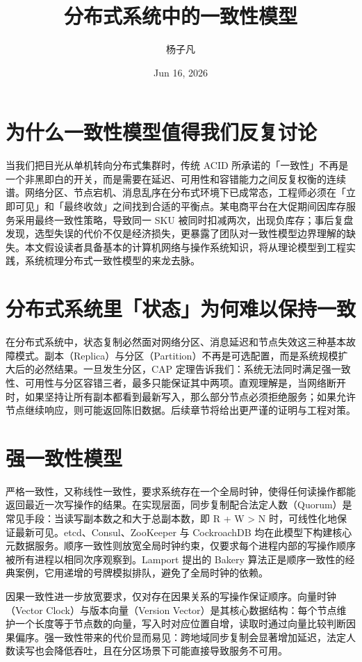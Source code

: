 \title{分布式系统中的一致性模型}
\author{杨子凡}
\date{Jun 16, 2026}
\maketitle
\chapter{为什么一致性模型值得我们反复讨论}
当我们把目光从单机转向分布式集群时，传统 ACID 所承诺的「一致性」不再是一个非黑即白的开关，而是需要在延迟、可用性和容错能力之间反复权衡的连续谱。网络分区、节点宕机、消息乱序在分布式环境下已成常态，工程师必须在「立即可见」和「最终收敛」之间找到合适的平衡点。某电商平台在大促期间因库存服务采用最终一致性策略，导致同一 SKU 被同时扣减两次，出现负库存；事后复盘发现，选型失误的代价不仅是经济损失，更暴露了团队对一致性模型边界理解的缺失。本文假设读者具备基本的计算机网络与操作系统知识，将从理论模型到工程实践，系统梳理分布式一致性模型的来龙去脉。\par
\chapter{分布式系统里「状态」为何难以保持一致}
在分布式系统中，状态复制必然面对网络分区、消息延迟和节点失效这三种基本故障模式。副本（Replica）与分区（Partition）不再是可选配置，而是系统规模扩大后的必然结果。一旦发生分区，CAP 定理告诉我们：系统无法同时满足强一致性、可用性与分区容错三者，最多只能保证其中两项。直观理解是，当网络断开时，如果坚持让所有副本都看到最新写入，那么部分节点必须拒绝服务；如果允许节点继续响应，则可能返回陈旧数据。后续章节将给出更严谨的证明与工程对策。\par
\chapter{强一致性模型}
严格一致性，又称线性一致性，要求系统存在一个全局时钟，使得任何读操作都能返回最近一次写操作的结果。在实现层面，同步复制配合法定人数（Quorum）是常见手段：当读写副本数之和大于总副本数，即 R + W > N 时，可线性化地保证最新可见。etcd、Consul、ZooKeeper 与 CockroachDB 均在此模型下构建核心元数据服务。顺序一致性则放宽全局时钟约束，仅要求每个进程内部的写操作顺序被所有进程以相同次序观察到。Lamport 提出的 Bakery 算法正是顺序一致性的经典案例，它用递增的号牌模拟排队，避免了全局时钟的依赖。\par
因果一致性进一步放宽要求，仅对存在因果关系的写操作保证顺序。向量时钟（Vector Clock）与版本向量（Version Vector）是其核心数据结构：每个节点维护一个长度等于节点数的向量，写入时对应位置自增，读取时通过向量比较判断因果偏序。强一致性带来的代价显而易见：跨地域同步复制会显著增加延迟，法定人数读写也会降低吞吐，且在分区场景下可能直接导致服务不可用。\par
